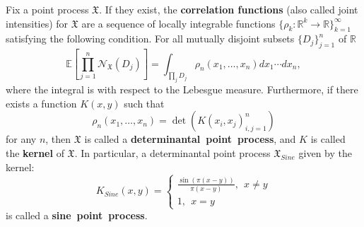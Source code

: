 \documentclass[11pt]{article}
\numberwithin{equation}{section}%
\numberwithin{theorem}{section}
\begin{document}
Fix a point process $\mathfrak{X}$. If they exist, the \textbf{correlation functions} (also called joint intensities) for $\mathfrak{X}$ are a sequence of locally integrable functions $\{\rho_k:\mathbb{R}^k\rightarrow\mathbb{R} \}_{k=1}^{\infty}$ satisfying the following condition. For all mutually disjoint subsets $\{D_j\}_{j=1}^n$ of $\mathbb{R}$ 
\begin{equation*}
	\mathbb{E} \left[\prod_{j=1}^{n} \mathcal{N}_{\mathfrak{X}}(D_j)\right] = \int_{\prod_j D_j} \rho_n(x_1,\dots,x_n) dx_1 \cdots dx_n,
\end{equation*}   
where the integral is with respect to the Lebesgue measure. Furthermore, if there exists a function $K(x,y)$ such that
\begin{equation*}
    \rho_n(x_1,\dots,x_n)=\det\left(K(x_i,x_j)_{i,j=1}^n\right)
\end{equation*}
for any $n$, then $\mathfrak{X}$ is called a \textbf{determinantal~point~process}, and $K$ is called the \textbf{kernel} of $\mathfrak{X}$. In particular, a determinantal point process $\mathfrak{X}_{Sine}$ given by the kernel:
\begin{equation*}
    K_{Sine}(x,y)=\left\{\begin{array}{cc}
      \frac{\sin(\pi(x-y))}{\pi(x-y)},~~x\ne y\\
      1,~~x=y
    \end{array}\right.
\end{equation*}
is called a \textbf{sine~point~process}.
\end{document}
